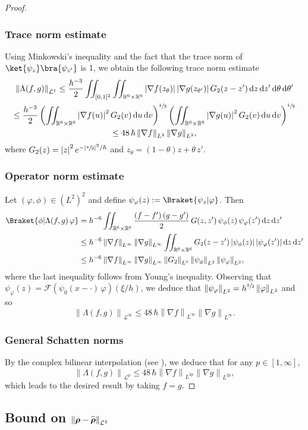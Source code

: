 \documentclass[JEP,XML,SOM,Unicode,NoEqCountersInSection,published]{cedram}
\newcommand {\an}[1] {\lvert #1\rvert}
\theoremstyle{definition}
\newcommand{\step}[1] {\subsubsection*{#1}}
\newcommand {\RR} {\mathbb R}
\newcommand {\RRd} {\RR^6}
\renewcommand {\L} {\mathcal L}
\newcommand {\ecF} {\mathscr{F}}
\let\lt\left
\let\rt\right
\renewcommand {\(} {\lt(}
\renewcommand {\)} {\rt)}
\newcommand {\n}[1] {\lt\lvert #1 \rt\rvert}
\newcommand {\nrm}[1] {\lt\lVert #1\rt\rVert}
\newcommand {\Nrm}[2] {\nrm{#1}_{#2}}
\renewcommand {\d} {\mathop{}\!\mathrm{d}}
\newcommand {\F}[1] {\ecF\!\( #1 \)}
\newcommand {\iintdd} {\iint_{\RRd\times\RRd}}
\newcommand {\Inprod}[2] {\Braket{#1 | #2}}
\newcommand {\op} {\boldsymbol{\rho}}
\begin{document}
\begin{proof}
\step{Trace norm estimate} Using Minkowski's inequality and the fact that the trace norm of $\ket{\psi_{z}}\bra{\psi_{z'}}$ is 1, we obtain the following trace norm estimate
\begin{multline*}
\Nrm{\Lambda(f,g)}{\L^1} \leq \frac{h^{-3}}{2} \iint_{[0,1]^2}\iintdd \n{\nabla f(z_\theta)} \n{\nabla g(z_{\theta'})} G_2(z-z') \d z \d z' \d \theta\d \theta'
\\
\leq \frac{h^{-3}}{2} \(\iintdd \n{\nabla f(u)}^2 G_2(v) \d u \d v\)^{\sfrac{1}{2}} \(\iintdd \n{\nabla g(u)}^2 G_2(v) \d u \d v\)^{\sfrac{1}{2}}
\\
\leq 48\,\hbar \Nrm{\nabla f}{L^2} {\Nrm{\nabla g}{L^2}},
\end{multline*}
where $G_2(z) = \n{z}^2 e^{-\an{\sfrac{z}{2}}^2/\hbar}$ and $z_\theta = \(1-\theta\) z + \theta\, z'$.
\step{Operator norm estimate} Let $(\varphi,\phi)\in (L^2)^2$ and define $\psi_\varphi(z) := \Inprod{\psi_z}{\varphi}$. Then
\begin{align*}
\Inprod{\phi}{\Lambda(f,g)\,\varphi} &= h^{-6} \iintdd \frac{\(f-f'\)\(g-g'\)}{2} \,G(z,z') \, \psi_{\phi}(z)\,\psi_{\varphi}(z') \d z \d z'
\\
&\leq h^{-6} \Nrm{\nabla f}{L^{\infty}}\Nrm{\nabla g}{L^{\infty}}\iintdd G_2(z-z') \n{\psi_{\phi}(z)}\n{\psi_{\varphi}(z')} \d z \d z'
\\
&\leq h^{-6} \Nrm{\nabla f}{L^{\infty}}\Nrm{\nabla g}{L^{\infty}}\Nrm{G_2}{L^1} \Nrm{\psi_{\phi}}{L^2}{\Nrm{\psi_{\varphi}}{L^2}},
\end{align*}
where the last inequality follows from Young's inequality. Observing that $\psi_\varphi(z) = \F{\psi_0(x-\cdot)\,\varphi}(\xi/h)$, we deduce that $\Nrm{\psi_\varphi}{L^2} = h^{\sfrac32} \Nrm{\varphi}{L^2}$ and so
\begin{equation*}
\Nrm{\Lambda(f,g)}{\L^\infty} \leq 48\,\hbar \Nrm{\nabla f}{L^{\infty}}{\Nrm{\nabla g}{L^{\infty}}}.
\end{equation*}

\step{General Schatten norms} By the complex bilinear interpolation (see \eg \cite[\S 4.4]{bergh_interpolation_1976}), we deduce that for any $p\in [1,\infty]$,
\begin{equation*}
\Nrm{\Lambda(f,g)}{\L^p} \leq 48\,\hbar \Nrm{\nabla f}{L^{2p}}{\Nrm{\nabla g}{L^{2p}}},
\end{equation*}
which leads to the desired result by taking $f=g$.
\end{proof}

\subsection{Bound on \texorpdfstring{$\Nrm{\op-\protect\widetilde{\op}}{\L^2}$}{auxiliary and Hartree} }\label{sec:op-opt}
\end{document}
